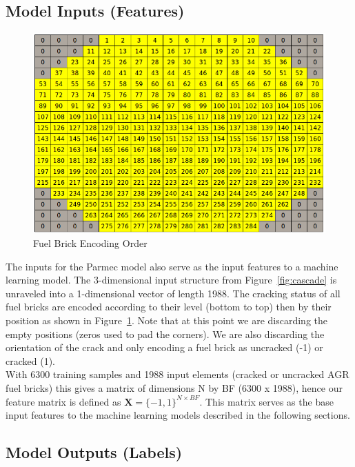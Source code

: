 \subsection{Model Inputs (Features)} \label{data:inputs}



\begin{figure}[t]
	\centering
	\includegraphics[scale=0.35]{Figures/fuel_channel_numbers.png}
	\caption{Fuel Brick Encoding Order}
	\label{fig:order}
\end{figure}


\noindent
The inputs for the Parmec model also serve as the input features to a machine learning model. The 3-dimensional input structure from Figure~\ref{fig:cascade} is unraveled into a 1-dimensional vector of length 1988. The cracking status of all fuel bricks are encoded according to their level (bottom to top) then by their position as shown in Figure~\ref{fig:order}. Note that at this point we are discarding the empty positions (zeros used to pad the corners). We are also discarding the orientation of the crack and only encoding a fuel brick as uncracked (-1) or cracked (1).
\\

\noindent
With 6300 training samples and 1988 input elements (cracked or uncracked AGR fuel bricks) this gives a matrix of dimensions N by BF (6300 x 1988), hence our feature matrix is defined as $\textbf{X} = \{-1, 1\}^{N \times BF}$. This matrix serves as the base input features to the machine learning models described in the following sections. 


\subsection{Model Outputs (Labels)} \label{data:outputs}

